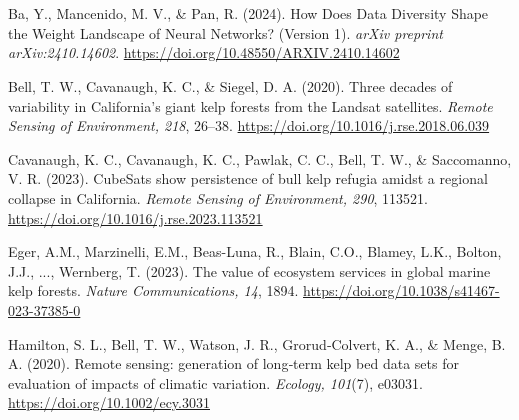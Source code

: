 \documentclass{article}
\begin{document}
\newpage

\section*{}
\begingroup 
\small 

\begin{thebibliography}{99} %

Ba, Y., Mancenido, M. V., \& Pan, R. (2024).
How Does Data Diversity Shape the Weight Landscape of Neural Networks? (Version 1).
\textit{arXiv preprint arXiv:2410.14602}.
\url{https://doi.org/10.48550/ARXIV.2410.14602}

Bell, T. W., Cavanaugh, K. C., \& Siegel, D. A. (2020).
Three decades of variability in California's giant kelp forests from the Landsat satellites.
\textit{Remote Sensing of Environment, 218}, 26--38.
\url{https://doi.org/10.1016/j.rse.2018.06.039}

Cavanaugh, K. C., Cavanaugh, K. C., Pawlak, C. C., Bell, T. W., \& Saccomanno, V. R. (2023).
CubeSats show persistence of bull kelp refugia amidst a regional collapse in California.
\textit{Remote Sensing of Environment, 290}, 113521.
\url{https://doi.org/10.1016/j.rse.2023.113521}

Eger, A.M., Marzinelli, E.M., Beas-Luna, R., Blain, C.O., Blamey, L.K., Bolton, J.J., ..., Wernberg, T. (2023). %
The value of ecosystem services in global marine kelp forests.
\textit{Nature Communications, 14}, 1894.
\url{https://doi.org/10.1038/s41467-023-37385-0}

Hamilton, S. L., Bell, T. W., Watson, J. R., Grorud‐Colvert, K. A., \& Menge, B. A. (2020).
Remote sensing: generation of long‐term kelp bed data sets for evaluation of impacts of climatic variation.
\textit{Ecology, 101}(7), e03031. %
\url{https://doi.org/10.1002/ecy.3031}


\end{thebibliography}
\end{document}
